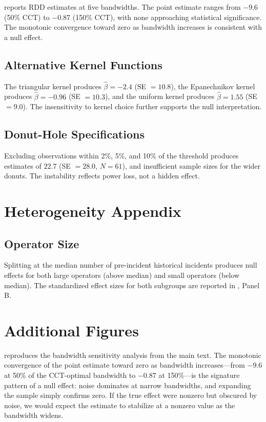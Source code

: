 \documentclass[12pt]{article}
\begin{document}
 reports RDD estimates at five bandwidths. The point estimate ranges from $-9.6$ (50\% CCT) to $-0.87$ (150\% CCT), with none approaching statistical significance. The monotonic convergence toward zero as bandwidth increases is consistent with a null effect.

\subsection{Alternative Kernel Functions}

The triangular kernel produces $\hat{\beta} = -2.4$ (SE $= 10.8$), the Epanechnikov kernel produces $\hat{\beta} = -0.96$ (SE $= 10.3$), and the uniform kernel produces $\hat{\beta} = 1.55$ (SE $= 9.0$). The insensitivity to kernel choice further supports the null interpretation.

\subsection{Donut-Hole Specifications}

Excluding observations within 2\%, 5\%, and 10\% of the threshold produces estimates of $22.7$ (SE $= 28.0$, $N = 61$), and insufficient sample sizes for the wider donuts. The instability reflects power loss, not a hidden effect.


\section{Heterogeneity Appendix}
\label{sec:app_hetero}

\subsection{Operator Size}

Splitting at the median number of pre-incident historical incidents produces null effects for both large operators (above median) and small operators (below median). The standardized effect sizes for both subgroups are reported in , Panel B.

\section{Additional Figures}
\label{sec:app_figs}

 reproduces the bandwidth sensitivity analysis from the main text. The monotonic convergence of the point estimate toward zero as bandwidth increases---from $-9.6$ at 50\% of the CCT-optimal bandwidth to $-0.87$ at 150\%---is the signature pattern of a null effect: noise dominates at narrow bandwidths, and expanding the sample simply confirms zero. If the true effect were nonzero but obscured by noise, we would expect the estimate to stabilize at a nonzero value as the bandwidth widens.
\end{document}
